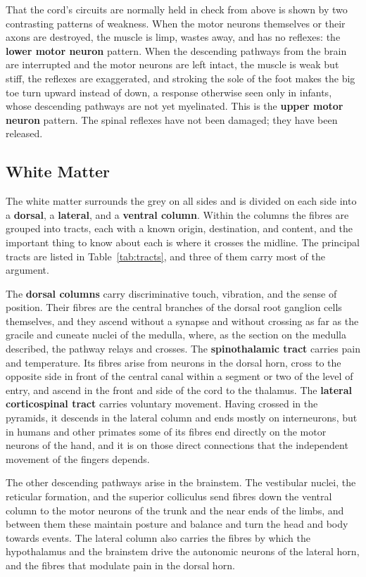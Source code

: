 \documentclass[11pt]{article}
\begin{document}
That the cord's circuits are normally held in check from above is shown by two contrasting patterns of weakness. When the motor neurons themselves or their axons are destroyed, the muscle is limp, wastes away, and has no reflexes: the \textbf{lower motor neuron} pattern. When the descending pathways from the brain are interrupted and the motor neurons are left intact, the muscle is weak but stiff, the reflexes are exaggerated, and stroking the sole of the foot makes the big toe turn upward instead of down, a response otherwise seen only in infants, whose descending pathways are not yet myelinated. This is the \textbf{upper motor neuron} pattern. The spinal reflexes have not been damaged; they have been released.

\subsection{White Matter}

The white matter surrounds the grey on all sides and is divided on each side into a \textbf{dorsal}, a \textbf{lateral}, and a \textbf{ventral column}. Within the columns the fibres are grouped into tracts, each with a known origin, destination, and content, and the important thing to know about each is where it crosses the midline. The principal tracts are listed in Table~\ref{tab:tracts}, and three of them carry most of the argument.

The \textbf{dorsal columns} carry discriminative touch, vibration, and the sense of position. Their fibres are the central branches of the dorsal root ganglion cells themselves, and they ascend without a synapse and without crossing as far as the gracile and cuneate nuclei of the medulla, where, as the section on the medulla described, the pathway relays and crosses. The \textbf{spinothalamic tract} carries pain and temperature. Its fibres arise from neurons in the dorsal horn, cross to the opposite side in front of the central canal within a segment or two of the level of entry, and ascend in the front and side of the cord to the thalamus. The \textbf{lateral corticospinal tract} carries voluntary movement. Having crossed in the pyramids, it descends in the lateral column and ends mostly on interneurons, but in humans and other primates some of its fibres end directly on the motor neurons of the hand, and it is on those direct connections that the independent movement of the fingers depends.

The other descending pathways arise in the brainstem. The vestibular nuclei, the reticular formation, and the superior colliculus send fibres down the ventral column to the motor neurons of the trunk and the near ends of the limbs, and between them these maintain posture and balance and turn the head and body towards events. The lateral column also carries the fibres by which the hypothalamus and the brainstem drive the autonomic neurons of the lateral horn, and the fibres that modulate pain in the dorsal horn.
\end{document}
